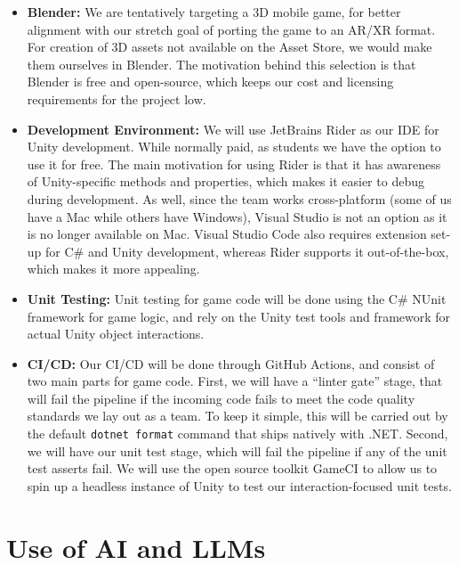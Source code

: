 \documentclass{article}
\begin{document}
\begin{itemize}
    \item \textbf{Blender:} We are tentatively targeting a 3D mobile game, for better alignment with our stretch goal of porting
    the game to an AR/XR format. For creation of 3D assets not available on the Asset Store, we would make them ourselves in Blender.
    The motivation behind this selection is that Blender is free and open-source, which keeps our cost and licensing requirements for the project low.

    \item \textbf{Development Environment:} We will use JetBrains Rider as our IDE for Unity development. While normally paid,
    as students we have the option to use it for free. The main motivation for using Rider is that it has awareness of Unity-specific
    methods and properties, which makes it easier to debug during development. As well, since the team works cross-platform
    (some of us have a Mac while others have Windows), Visual Studio is not an option as it is no longer available on Mac.
    Visual Studio Code also requires extension set-up for C\# and Unity development, whereas Rider supports it out-of-the-box,
    which makes it more appealing.

    \item \textbf{Unit Testing:} Unit testing for game code will be done using the C\# NUnit framework for game logic,
    and rely on the Unity test tools and framework for actual Unity object interactions.

    \item \textbf{CI/CD:} Our CI/CD will be done through GitHub Actions, and consist of two main parts for game code. First,
    we will have a “linter gate” stage, that will fail the pipeline if the incoming code fails to meet the code quality standards
    we lay out as a team. To keep it simple, this will be carried out by the default \texttt{dotnet format} command that ships
    natively with .NET. Second, we will have our unit test stage, which will fail the pipeline if any of the unit test asserts fail.
    We will use the open source toolkit GameCI to allow us to spin up a headless instance of Unity to test our interaction-focused unit tests.
\end{itemize}

\section{Use of AI and LLMs}
\end{document}
